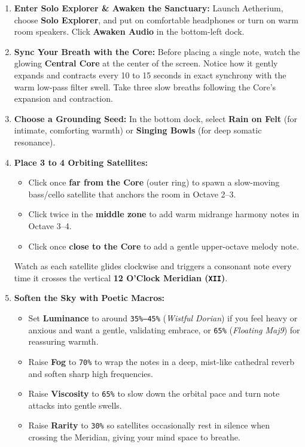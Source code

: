 \documentclass[11pt,oneside,openany]{book}
\begin{document}
\begin{enumerate}
  \item \textbf{Enter Solo Explorer \& Awaken the Sanctuary:} Launch Aetherium, choose \textbf{Solo Explorer}, and put on comfortable headphones or turn on warm room speakers. Click \textbf{Awaken Audio} in the bottom-left dock.
  \item \textbf{Sync Your Breath with the Core:} Before placing a single note, watch the glowing \textbf{Central Core} at the center of the screen. Notice how it gently expands and contracts every 10 to 15 seconds in exact synchrony with the warm low-pass filter swell. Take three slow breaths following the Core's expansion and contraction.
  \item \textbf{Choose a Grounding Seed:} In the bottom dock, select \textbf{Rain on Felt} (for intimate, comforting warmth) or \textbf{Singing Bowls} (for deep somatic resonance).
  \item \textbf{Place 3 to 4 Orbiting Satellites:}
    \begin{itemize}
      \item Click once \textbf{far from the Core} (outer ring) to spawn a slow-moving bass/cello satellite that anchors the room in Octave 2--3.
      \item Click twice in the \textbf{middle zone} to add warm midrange harmony notes in Octave 3--4.
      \item Click once \textbf{close to the Core} to add a gentle upper-octave melody note.
    \end{itemize}
    Watch as each satellite glides clockwise and triggers a consonant note every time it crosses the vertical \textbf{12 O'Clock Meridian (\texttt{XII})}.
  \item \textbf{Soften the Sky with Poetic Macros:}
    \begin{itemize}
      \item Set \textbf{Luminance} to around \texttt{35\%--45\%} (\textit{Wistful Dorian}) if you feel heavy or anxious and want a gentle, validating embrace, or \texttt{65\%} (\textit{Floating Maj9}) for reassuring warmth.
      \item Raise \textbf{Fog} to \texttt{70\%} to wrap the notes in a deep, mist-like cathedral reverb and soften sharp high frequencies.
      \item Raise \textbf{Viscosity} to \texttt{65\%} to slow down the orbital pace and turn note attacks into gentle swells.
      \item Raise \textbf{Rarity} to \texttt{30\%} so satellites occasionally rest in silence when crossing the Meridian, giving your mind space to breathe.
    \end{itemize}
\end{enumerate}
\end{document}
